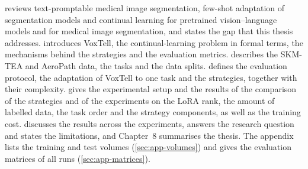  reviews text-promptable medical image segmentation, few-shot adaptation of segmentation models and continual learning for pretrained vision--language models and for medical image segmentation, and states the gap that this thesis addresses.
 introduces VoxTell, the continual-learning problem in formal terms, the mechanisms behind the strategies and the evaluation metrics.
 describes the SKM-TEA and AeroPath data, the tasks and the data splits.
 defines the evaluation protocol, the adaptation of VoxTell to one task and the strategies, together with their complexity.
 gives the experimental setup and the results of the comparison of the strategies and of the experiments on the LoRA rank, the amount of labelled data, the task order and the strategy components, as well as the training cost.
 discusses the results across the experiments, answers the research question and states the limitations, and Chapter~8 summarises the thesis.
The appendix lists the training and test volumes (\cref{sec:app-volumes}) and gives the evaluation matrices of all runs (\cref{sec:app-matrices}).

